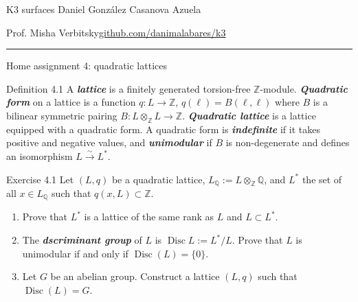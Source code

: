 

\usepackage[style=authortitle-terse,backend=bibtex]{biblatex}


\setcounter{secnumdepth}{0}



\begin{minipage}{\textwidth}
	\begin{minipage}{1\textwidth}
		K3 surfaces \hfill Daniel González Casanova Azuela
		
		{\small Prof. Misha Verbitsky\hfill\href{https://github.com/danimalabares/k3}{github.com/danimalabares/k3}}
	\end{minipage}
\end{minipage}\vspace{.2cm}\hrule

\vspace{10pt}
{\huge Home assignment 4: quadratic lattices}

\begin{idea5}{Definition 4.1}\leavevmode
	A \textit{\textbf{lattice}} is a finitely generated torsion-free $\mathbb{Z}$-module. \textit{\textbf{Quadratic form}} on a lattice is a function $q:L\to \mathbb{Z}$, $q(\ell)=B(\ell,\ell)$ where $B$ is a bilinear symmetric pairing $B:L\otimes_\mathbb{Z}L\longrightarrow \mathbb{Z}$. \textit{\textbf{Quadratic lattice}} is a lattice equipped with a quadratic form. A quadratic form is \textit{\textbf{indefinite}} if it takes positive and negative values, and \textit{\textbf{unimodular}} if $B$ is non-degenerate and defines an isomorphism $L\xrightarrow{\sim}L^*$.
\end{idea5}
\iffalse
\begin{idea1}{Question}\leavevmode
	With respect to the definition of unimodular, are non-degeneracy and isomorphism $L\cong L^*$ two \textit{independant} conditions? Because I thought the definition of non-degenerate form (at least for vector spaces) is that interior multiplication is an isomorphism $V\cong V^*$.
\end{idea1}\fi

\begin{idea4}{Exercise 4.1}\leavevmode
	Let $(L,q)$ be a quadratic lattice, $L_{\mathbb{Q}}:=L\otimes_{\mathbb{Z}}\mathbb{Q}$, and $L^*$ the set of all $x\in L_{\mathbb{Q}}$ such that $q(x,L)\subset \mathbb{Z}$.
	\begin{enumerate}[label=\alph*.]
		\item Prove that $L^*$ is a lattice of the same rank as $L$ and $L\subset L^*$.
		\item The \textit{\textbf{dscriminant group}} of $L$ is $\operatorname{Disc}L:=L^*/L$. Prove that $L$ is unimodular if and only if $\operatorname{Disc}(L)=\{0\}$.
		\item Let $G$ be an abelian group. Construct a lattice $(L,q)$ such that $\operatorname{Disc}(L)=G$.
	\end{enumerate}
\end{idea4}

